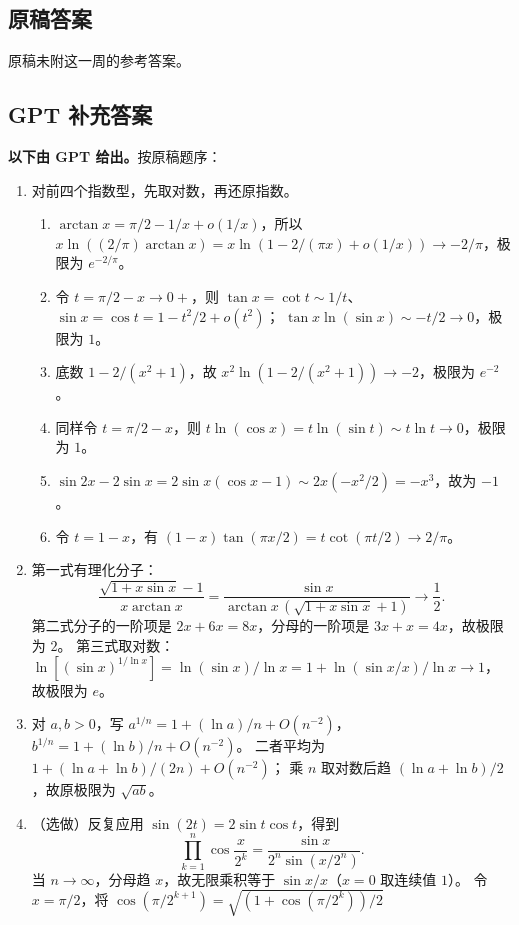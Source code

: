 \documentclass[UTF8,11pt, a4paper, oneside, fontset=none]{ctexbook}
\begin{document}
\clearpage

\subsection*{原稿答案}

\noindent 原稿未附这一周的参考答案。

\clearpage

\subsection*{GPT 补充答案}

\noindent\textbf{以下由 GPT 给出。}按原稿题序：
\begin{enumerate}
\item 对前四个指数型，先取对数，再还原指数。
\begin{enumerate}
\item $\arctan x=\pi/2-1/x+o(1/x)$，所以
$x\ln((2/\pi)\arctan x)
=x\ln(1-2/(\pi x)+o(1/x))\to-2/\pi$，极限为 $e^{-2/\pi}$。
\item 令 $t=\pi/2-x\to0+$，则
$\tan x=\cot t\sim1/t$、$\sin x=\cos t=1-t^2/2+o(t^2)$；
$\tan x\ln(\sin x)\sim-t/2\to0$，极限为 $1$。
\item 底数 $1-2/(x^2+1)$，故
$x^2\ln(1-2/(x^2+1))\to-2$，极限为 $e^{-2}$。
\item 同样令 $t=\pi/2-x$，则
$t\ln(\cos x)=t\ln(\sin t)\sim t\ln t\to0$，极限为 $1$。
\item $\sin2x-2\sin x=2\sin x(\cos x-1)\sim2x(-x^2/2)=-x^3$，故为 $-1$。
\item 令 $t=1-x$，有
$(1-x)\tan(\pi x/2)=t\cot(\pi t/2)\to2/\pi$。
\end{enumerate}
\item 第一式有理化分子：
\[
\frac{\sqrt{1+x\sin x}-1}{x\arctan x}
=\frac{\sin x}{\arctan x\,(\sqrt{1+x\sin x}+1)}
\longrightarrow\frac12.
\]
第二式分子的一阶项是 $2x+6x=8x$，分母的一阶项是 $3x+x=4x$，故极限为 $2$。
第三式取对数：$\ln[(\sin x)^{1/\ln x}]
=\ln(\sin x)/\ln x
=1+\ln(\sin x/x)/\ln x\to1$，故极限为 $e$。
\item 对 $a,b>0$，写
$a^{1/n}=1+(\ln a)/n+O(n^{-2})$，$b^{1/n}=1+(\ln b)/n+O(n^{-2})$。
二者平均为 $1+(\ln a+\ln b)/(2n)+O(n^{-2})$；
乘 $n$ 取对数后趋 $(\ln a+\ln b)/2$，故原极限为 $\sqrt{ab}$。
\item（选做）反复应用 $\sin(2t)=2\sin t\cos t$，得到
\[
\prod_{k=1}^n\cos\frac{x}{2^k}
=\frac{\sin x}{2^n\sin(x/2^n)}.
\]
当 $n\to\infty$，分母趋 $x$，故无限乘积等于 $\sin x/x$（$x=0$ 取连续值 $1$）。
令 $x=\pi/2$，将
$\cos(\pi/2^{k+1})=\sqrt{(1+\cos(\pi/2^k))/2}$

\end{enumerate}
\end{document}
